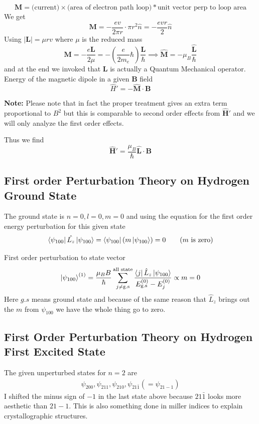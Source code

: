 \documentclass[10pt]{article}
\newcommand{\hb}{\hbar}
\renewcommand{\vec}{\mathbf}
\renewcommand{\vec}{\mathbf}
\begin{document}
\[
\vec{M} = \text{(current)} \times \text{(area of electron path loop)} * \text{unit vector perp to loop area}
\] 
We get
\[
\vec{M} = - \frac{ev}{2 \pi r} \cdot  \pi r^2  \hat{n} = - \frac{evr}{2} \hat{n}
\]
\newcommand{\hb}{\hbar} 
Using $|\vec{L}| = \mu r v$ where $\mu$ is the reduced mass
\[
\vec{M} = - \frac{e \vec{L}}{2 \mu} = - \left(\frac{e}{2 m_e} \hb \right) \frac{\vec{L}}{\hb} \implies 
\hat{\mathbf{M}} = - \mu_B \frac{\hat{\mathbf{L}}}{\hb}
\]
and at the end we invoked that $\vec{L}$ is actually a Quantum Mechanical operator.
Energy of the magnetic dipole in a given $\vec{B}$ field 
\[
	\hat{H}' = - \hat{\mathbf{M}}\cdot \vec{B}
\] 
\begin{margintable} \textbf{Note:}
	Please note that in fact the proper treatment gives an extra term  proportional to $B^2$ but this is comparable to second order effects from $\hat{\vec{H}}'$ and we will only analyze the first order effects. 
\end{margintable}
Thus we find 
\[
\boxed{
\hat{\vec{H}} ' = \frac{\mu_B}{\hb} \hat{\vec{L}}\cdot \vec{B}
}
\] 


\subsection*{First order Perturbation Theory on Hydrogen Ground State} 
The ground state is $n = 0, l = 0, m = 0$ and using the equation for the first order energy perturbation for this given state
\[
	\bra{\psi_{100}} \hat{L_z} \ket{\psi_{100}} =  \bra{\psi_{100}} \left(m \ket{\psi_{100}}\right) = 0 \tag{$m$ is zero}	
\] 

First order perturbation to state vector 
\[
	\ket{\psi_{100}}^{(1)} = \frac{\mu_B B}{\hb}
	\sum_{j \neq \text{g.s}}^{\text{all state}} \frac{\bra{j} \hat{L}_z \ket{\psi_{100}}}{E_{\text{g.s}}^{(0)} - E_j^{(0)}} \propto m =0
\] 	
Here $g.s$ means ground state and because of the same reason that $\hat{L}_z$ brings out the $m$ from $\psi_{100}$ we have the whole thing go to zero.

\subsection*{First Order Perturbation Theory on Hydrogen First Excited State}
The given unperturbed states for $n = 2$ are 
\begin{align*}
	\psi_{200}, \psi_{211}, \psi_{210}, \psi_{21 \bar{1}}  (= \psi_{21-1} )
\end{align*}
I shifted the minus sign of $-1$ in the last state above because $21 \bar{1}$ looks more aesthetic than $21-1$. This is also something done in miller indices to explain crystallographic structures.
\end{document}
